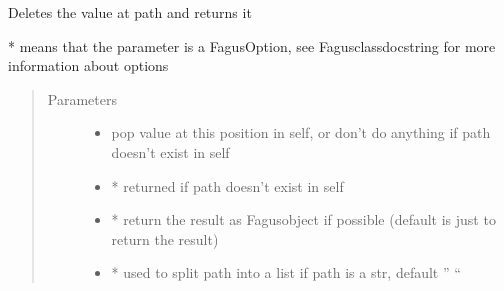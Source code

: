 \documentclass[a4paper,10pt,english]{sphinxmanual}
\begin{document}
\begin{fulllineitems}
\begin{fulllineitems}
\begin{quote}
\begin{description}
\end{description}\end{quote}

\end{fulllineitems}


\begin{fulllineitems}
\label{\detokenize{fagus:fagus.Fagus.pop}}
\pysigstartsignatures
{}
\pysigstopsignatures
\sphinxAtStartPar
Deletes the value at path and returns it

\sphinxAtStartPar
* means that the parameter is a FagusOption, see Fagus\sphinxhyphen{}class\sphinxhyphen{}docstring for more information about options
\begin{quote}\begin{description}
\item[{Parameters}] \leavevmode\begin{itemize}
\item {}
\sphinxAtStartPar
{} \textendash{} pop value at this position in self, or don’t do anything if path doesn’t exist in self

\item {}
\sphinxAtStartPar
{} \textendash{} * returned if path doesn’t exist in self

\item {}
\sphinxAtStartPar
{} \textendash{} * return the result as Fagus\sphinxhyphen{}object if possible (default is just to return the result)

\item {}
\sphinxAtStartPar
{} \textendash{} * used to split path into a list if path is a str, default ” “


\end{itemize}
\end{description}
\end{quote}
\end{fulllineitems}
\end{fulllineitems}
\end{document}
